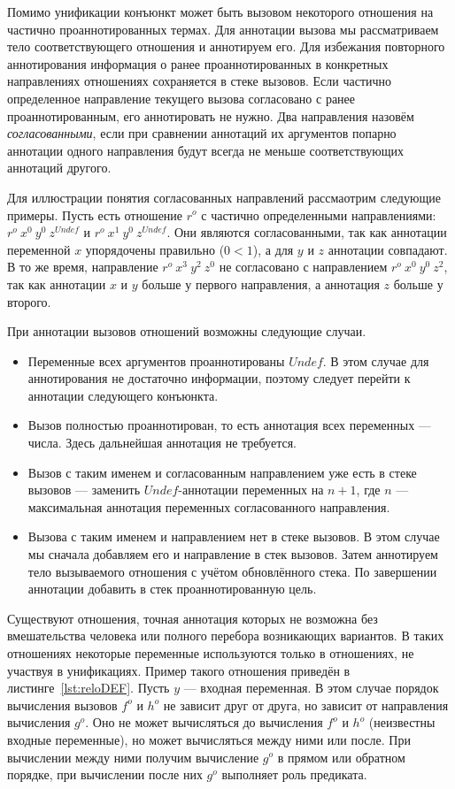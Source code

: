 \documentclass[conference,american,russian]{IEEEtran}
\begin{document}
Помимо унификации конъюнкт может быть вызовом некоторого отношения на частично проаннотированных термах. 
Для аннотации вызова мы рассматриваем тело соответствующего отношения и аннотируем его. 
Для избежания повторного аннотирования информация о ранее проаннотированных в конкретных направлениях отношениях сохраняется в стеке вызовов.
Если частично определенное направление текущего вызова согласовано с ранее проаннотированным, его аннотировать не нужно.  
Два направления назовём \emph{согласованными}, если при сравнении аннотаций их аргументов попарно аннотации одного направления будут всегда не меньше соответствующих аннотаций другого.

Для иллюстрации понятия согласованных направлений рассмаотрим следующие примеры. 
Пусть есть отношение $r^o$ с частично определенными направлениями: $r^o \ x^0 \ y^0 \ z^{Undef}$ и $r^o \ x^1 \ y^0 \ z^{Undef}$.
Они являются согласованными, так как аннотации переменной $x$ упорядочены правильно ($0 < 1$), а для $y$ и $z$ аннотации совпадают.
В то же время, направление $r^o \ x^3 \ y^2 \ z^0$ не согласовано с направлением $r^o \ x^0 \ y^0 \ z^2$, так как аннотации $x$ и $y$ больше у первого направления, а аннотация $z$ больше у второго.

При аннотации вызовов отношений возможны следующие случаи. 
\begin{itemize}
    \item Переменные всех аргументов проаннотированы $Undef$. В этом случае для аннотирования не достаточно информации, поэтому следует перейти к аннотации следующего конъюнкта. 
    \item Вызов полностью проаннотирован, то есть аннотация всех переменных --- числа. Здесь дальнейшая аннотация не требуется.
    \item Вызов с таким именем и согласованным направлением уже есть в стеке вызовов --- заменить $Undef$-аннотации переменных на $n+1$, где $n$ --- максимальная аннотация переменных согласованного направления.
    \item Вызова с таким именем и направлением нет в стеке вызовов.
    В этом случае мы сначала добавляем его и направление в стек вызовов. 
    Затем аннотируем тело вызываемого отношения с учётом обновлённого стека. 
    По завершении аннотации добавить в стек проаннотированную цель.
\end{itemize}

Существуют отношения, точная аннотация которых не возможна без вмешательства человека или полного перебора возникающих вариантов. 
В таких отношениях некоторые переменные используются только в отношениях, не участвуя в унификациях.
Пример такого отношения приведён в листинге~\ref{lst:reloDEF}.
Пусть $y$ --- входная переменная.
В этом случае порядок вычисления вызовов $f^o$ и $h^o$ не зависит друг от друга, но зависит от направления вычисления $g^o$.
Оно не может вычисляться до вычисления $f^o$ и $h^o$ (неизвестны входные переменные), но может вычисляться между ними или после.
При вычислении между ними получим вычисление $g^o$ в прямом или обратном порядке, при вычислении после них $g^o$ выполняет роль предиката.
\end{document}
